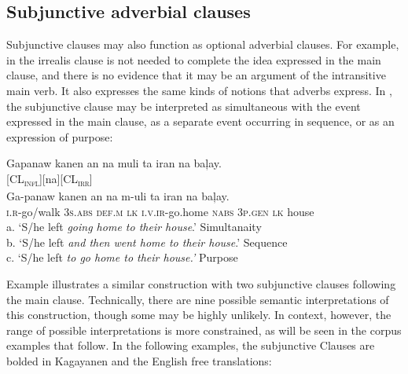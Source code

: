 \subsection{Subjunctive adverbial clauses}
\label{bkm:Ref117759078} \label{sec:subjunctiveadverbialclauses}
Subjunctive clauses may also function as optional adverbial clauses. For example, in  the irrealis clause is not needed to complete the idea expressed in the main clause, and there is no evidence that it may be an argument of the intransitive main verb. It also expresses the same kinds of notions that adverbs express. In , the subjunctive clause may be interpreted as simultaneous with the event expressed in the main clause, as a separate event occurring in sequence, or as an expression of purpose:


\ea
\label{bkm:Ref460685260}
Gapanaw  kanen  an  na  muli  ta  iran  na  baļay. \smallskip\\{}
[\hspace{1.1cm}CL\textsc{\textsubscript{infl}\hspace{1.1cm}}]\hspace{.4cm}[na][\hspace{2.4cm}CL\textsc{\textsubscript{irr}}\hspace{2.4cm}] \\
\gll Ga-panaw  kanen  an  na  m-uli  ta  iran  na  baļay. \\
\textsc{i.r}-go/walk  3\textsc{s.abs}  \textsc{def.m}  \textsc{lk}  \textsc{i.v.ir}-go.home  \textsc{nabs}  3\textsc{p.gen}  \textsc{lk}  house \\
\glt
a. ‘S/he left \textit{going home to their house}.’ Simultanaity \\
b. ‘S/he left \textit{and then went home to their house}.’ Sequence \\
c. ‘S/he left \textit{to go home to their house.’} Purpose
\z

Example  illustrates a similar construction with two subjunctive clauses following the main clause. Technically, there are nine possible semantic interpretations of this construction, though some may be highly unlikely. In context, however, the range of possible interpretations is more constrained, as will be seen in the corpus examples that follow. In the following examples, the subjunctive Clauses are bolded in Kagayanen and the English free translations:

